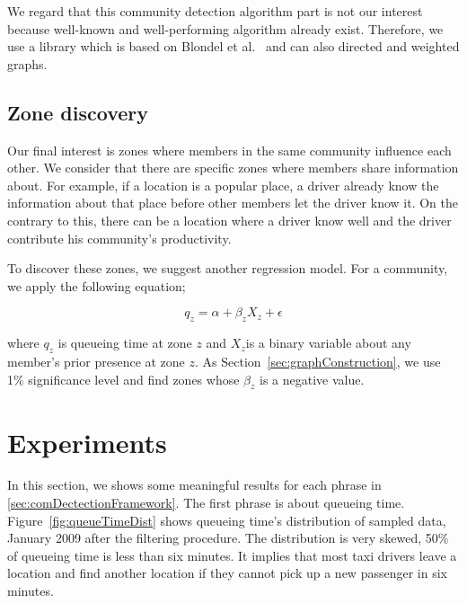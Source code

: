 \documentclass{article}
\begin{document}
We regard that this community detection algorithm part is not our interest because well-known and well-performing algorithm already exist. Therefore, we use a library which is based on  Blondel et al.~ and can also directed and weighted graphs.


\subsection{Zone discovery} \label{sec:zoneDiscovery}

Our final interest is zones where members in the same community influence each other. We consider that there are specific zones where members share information about. For example, if a location is a popular place, a driver already know the information about that place before other members let the driver know it. On the contrary to this, there can be a location where a driver know well and the driver contribute his community's productivity.

To discover these zones, we suggest another regression model. For a community, we apply the following equation;

\begin{equation} \label{eq:zoneRegression}
	q_{z}= \alpha + \beta_{z}X_{z} + \epsilon
\end{equation}

\noindent where $q_{z}$ is queueing time at zone $z$ and $X_{z}$is a binary variable about any member's prior presence at zone $z$. As Section~\ref{sec:graphConstruction}, we use 1\% significance level and find zones whose $\beta_{z}$ is a negative value.

\section{Experiments} \label{sec:experiments}

In this section, we shows some meaningful results for each phrase in \ref{sec:comDectectionFramework}. The first phrase is about queueing time. Figure~\ref{fig:queueTimeDist} shows queueing time's distribution of sampled data, January 2009 after the filtering procedure. The distribution is very skewed, 50\% of queueing time is less than six minutes. It implies that most taxi drivers leave a location and find another location if they cannot pick up a new passenger in six minutes. 
\end{document}
